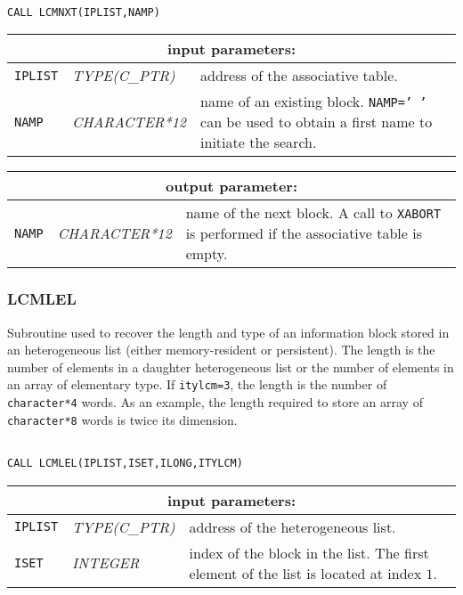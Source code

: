 \begin{verbatim}

CALL LCMNXT(IPLIST,NAMP)
\end{verbatim}

\noindent
\begin{tabular}{|p{1.5cm}|p{3cm}|p{10cm}|}
\hline
\multicolumn{3}{|c|}{\bf input parameters:} \\
\hline
{\tt IPLIST} & {\it TYPE(C\_PTR)} & address of the associative table. \\
\hline
{\tt NAMP} & {\it CHARACTER*12} &  name of an existing block.
                                   {\tt NAMP=' '} can be used to obtain a first name to initiate the search. \\
\hline
\end{tabular}

\vskip 0.8cm

\noindent
\begin{tabular}{|p{1.5cm}|p{3cm}|p{10cm}|}
\hline
\multicolumn{3}{|c|}{\bf output parameter:} \\
\hline
{\tt NAMP} & {\it CHARACTER*12} & name of the next block. 
A call to {\tt XABORT} is performed if the associative table is empty. \\
\hline
\end{tabular}

\subsubsection{LCMLEL}

Subroutine used to recover the length and type of an information block stored in an
heterogeneous list (either memory-resident or persistent). The length is the number of
elements in a daughter heterogeneous list or the number of elements in an array of elementary type.
If {\tt itylcm=3}, the length is the number of {\tt character*4} words. As an example, the length required
to store an array of {\tt character*8} words is twice its dimension.

\begin{verbatim}

CALL LCMLEL(IPLIST,ISET,ILONG,ITYLCM)
\end{verbatim}

\noindent
\begin{tabular}{|p{1.5cm}|p{3cm}|p{10cm}|}
\hline
\multicolumn{3}{|c|}{\bf input parameters:} \\
\hline
{\tt IPLIST} & {\it TYPE(C\_PTR)} & address of the heterogeneous list. \\
\hline
{\tt ISET} & {\it INTEGER} & index of the block in the list.
The first element of the list is located at index $1$.\\
\hline
\end{tabular}

